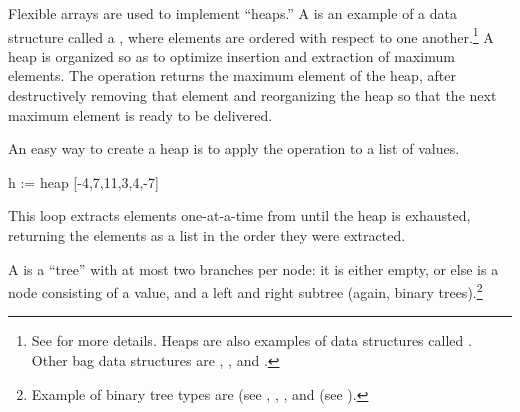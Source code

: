 {{{{{{{{Flexible arrays are used to implement ``heaps.'' A
 is an example of a data structure called a
, where elements are ordered with
respect to one another.\footnote{See  for more details.
Heaps are also examples of data structures called
.
Other bag data structures are , ,
and .}
A heap is organized
so as to optimize insertion and extraction of maximum elements.
The  operation
returns the maximum element of the heap, after destructively
removing that element and
reorganizing the heap
so that the next maximum element is ready to be delivered.

\begin{xtc}
\begin{xtccomment}
An easy way to create a heap is to apply the
operation  to a list of values.
\end{xtccomment}
\begin{spadsrc}
h := heap [-4,7,11,3,4,-7]
\end{spadsrc}
\begin{TeXOutput}
\begin{fricasmath}{13}
%
\end{fricasmath}
\end{TeXOutput}
\end{xtc}
\begin{xtc}
\begin{xtccomment}
This loop extracts elements one-at-a-time from 
until the heap is exhausted, returning the elements
as a list in the order they were extracted.
\end{xtccomment}
\begin{spadsrc}
\end{spadsrc}
\begin{TeXOutput}
\begin{fricasmath}{14}
%
\end{fricasmath}
\end{TeXOutput}
\end{xtc}

A  is a ``tree'' with at most two branches
per node: it is either empty, or else is a node consisting of a
value, and a left and right subtree (again, binary trees).\footnote{Example of binary tree types are
 (see ,
, ,
and  (see ).}

}}}}}}}}
